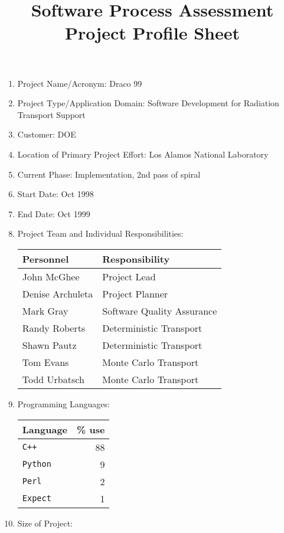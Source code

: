 \title{Software Process Assessment\\ Project Profile Sheet}

\maketitle
\begin{enumerate}
\item Project Name/Acronym: Draco 99
\item Project Type/Application Domain: Software Development for
Radiation Transport Support 
\item Customer: DOE
\item Location of Primary Project Effort: Los Alamos National
Laboratory
\item Current Phase: Implementation, 2nd pass of spiral
\item Start Date: Oct 1998
\item End Date: Oct 1999
\item Project Team and Individual Responsibilities:
\begin{center}
\begin{tabular}{l|l}
Personnel & Responsibility \\ \hline
John McGhee & Project Lead \\
Denise Archuleta & Project Planner \\
Mark Gray & Software Quality Assurance \\
Randy Roberts & Deterministic Transport \\
Shawn Pautz & Deterministic Transport \\
Tom Evans & Monte Carlo Transport \\
Todd Urbatsch & Monte Carlo Transport \\
\end{tabular}
\end{center}
\item Programming Languages:
\begin{center}
\begin{tabular}{l|r}
Language & \% use \\ \hline
{\tt C++} & 88 \\
{\tt Python} & 9 \\
{\tt Perl} & 2 \\
{\tt Expect} & 1
\end{tabular}
\end{center}
\item Size of Project:
\begin{center}

\end{center}
\end{enumerate}
